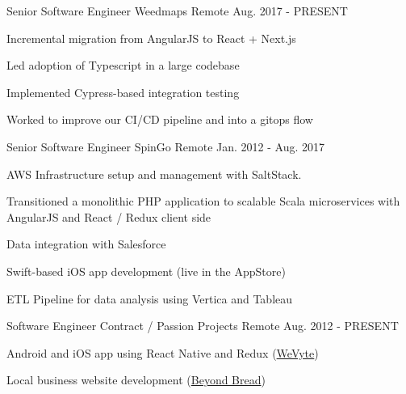 
\begin{cventries}

  \cventry
    {Senior Software Engineer} %
    {Weedmaps} %
    {Remote} %
    {Aug. 2017 - PRESENT} %
    {
      \begin{cvitems} %
        \item {Incremental migration from AngularJS to React + Next.js}
        \item {Led adoption of Typescript in a large codebase}
        \item {Implemented Cypress-based integration testing}
        \item {Worked to improve our CI/CD pipeline and into a gitops flow}
      \end{cvitems}
    }
 
  \cventry
    {Senior Software Engineer} %
    {SpinGo} %
    {Remote} %
    {Jan. 2012 - Aug. 2017} %
    {
      \begin{cvitems} %
        \item {AWS Infrastructure setup and management with SaltStack.}
        \item {Transitioned a monolithic PHP application to scalable Scala microservices with AngularJS and React / Redux client side}
        \item {Data integration with Salesforce}
        \item {Swift-based iOS app development (live in the AppStore)}
        \item {ETL Pipeline for data analysis using Vertica and Tableau}
      \end{cvitems}
    }

  \cventry
    {Software Engineer} %
    {Contract / Passion Projects} %
    {Remote} %
    {Aug. 2012 - PRESENT} %
    {
      \begin{cvitems} %
        \item {Android and iOS app using React Native and Redux (\href{http://wevyte.com}{WeVyte})}
        \item {Local business website development (\href{http://beyondbread.com}{Beyond Bread})}
      \end{cvitems}
    }



\end{cventries}
